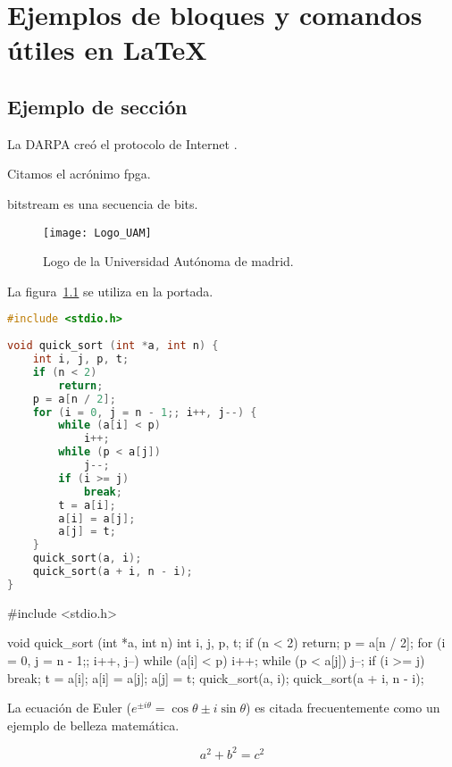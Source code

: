 \chapter{Ejemplos de bloques y comandos útiles en LaTeX\label{sec:ejemplos}}
\section{Ejemplo de sección}

%
%

La DARPA creó el protocolo de Internet \cite{ipv4sta}.

Citamos el acrónimo \gls{fpga}.

\Gls{bitstream} es una secuencia de bits.

\begin{figure}[htp!]
  \centering
  \texttt{[image: Logo\_UAM]}
  \caption{Logo de la Universidad Autónoma de madrid.}
  \label{fig:logo_uam}
\end{figure} 

La figura~\ref{fig:logo_uam} se utiliza en la portada.

\clearpage

\begin{lstlisting}[label=algoritmo:quicksort,language=C,frame=single,caption=Algoritmo de ordenación Quicksort]
#include <stdio.h>
 
void quick_sort (int *a, int n) {
    int i, j, p, t;
    if (n < 2)
        return;
    p = a[n / 2];
    for (i = 0, j = n - 1;; i++, j--) {
        while (a[i] < p)
            i++;
        while (p < a[j])
            j--;
        if (i >= j)
            break;
        t = a[i];
        a[i] = a[j];
        a[j] = t;
    }
    quick_sort(a, i);
    quick_sort(a + i, n - i);
}
\end{lstlisting}

\begin{code}
#include <stdio.h>
 
void quick_sort (int *a, int n) {
    int i, j, p, t;
    if (n < 2)
        return;
    p = a[n / 2];
    for (i = 0, j = n - 1;; i++, j--) {
        while (a[i] < p)
            i++;
        while (p < a[j])
            j--;
        if (i >= j)
            break;
        t = a[i];
        a[i] = a[j];
        a[j] = t;
    }
    quick_sort(a, i);
    quick_sort(a + i, n - i);
}
\end{code}

La ecuación de Euler ($e^{ \pm i\theta } = \cos \theta \pm i\sin \theta$) es citada frecuentemente como un ejemplo de belleza matemática.

\begin{equation}\label{eq:pythagoras}
a^2 + b^2 = c^2
\end{equation}
